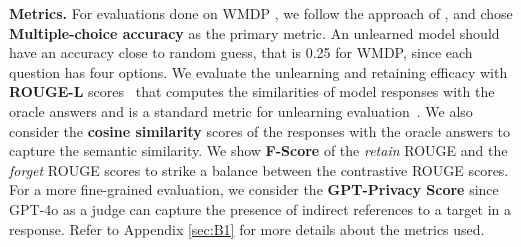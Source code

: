 \textbf{Metrics.} For evaluations done on WMDP \cite{li2024wmdpbenchmarkmeasuringreducing}, we follow the approach of \citet{li2024wmdpbenchmarkmeasuringreducing}, \citet{liu2024largelanguagemodelunlearning} and chose \textbf{Multiple-choice accuracy} as the primary metric. An unlearned model should have an accuracy close to random guess, that is 0.25 for WMDP, since each question has four options. We evaluate the unlearning and retaining efficacy with \textbf{ROUGE-L} scores~\cite{lin-2004-rouge} that computes the similarities of model responses with the oracle answers and is a standard metric for unlearning evaluation~\cite{liu2024largelanguagemodelunlearning, maini2024tofu, liu2024revisitingwhosharrypotter, sinha2024unstarunlearningselftaughtantisample}. We also consider the \textbf{cosine similarity} scores of the responses with the oracle answers to capture the semantic similarity. We show \textbf{F-Score} of the \textit{retain} ROUGE and the \textit{forget} ROUGE scores to strike a balance between the contrastive ROUGE scores. For a more fine-grained evaluation, we consider the \textbf{GPT-Privacy Score} \cite{liu2024revisitingwhosharrypotter, sinha2024unstarunlearningselftaughtantisample} since GPT-4o \cite{achiam2023gpt} as a judge can capture the presence of indirect references to a target in a response. Refer to Appendix \ref{sec:B1} for more details about the metrics used.


